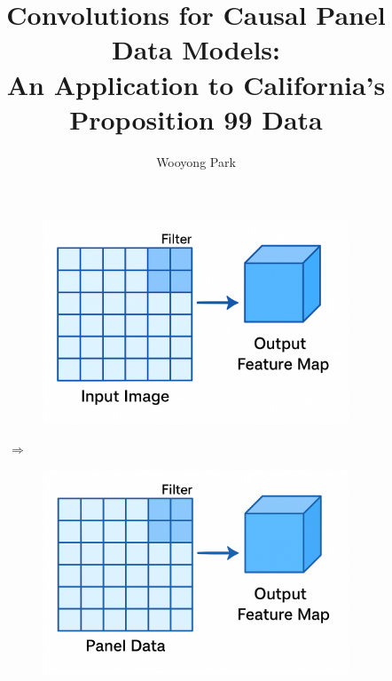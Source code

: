 \documentclass[12pt]{article}
\title{Convolutions for Causal Panel Data Models:\\
	An Application to California's Proposition 99 Data
}
\author{
	Wooyong Park\\
	\multicolumn{1}{p{.7\textwidth}}{\centering Yonsei University} 
}
\date{}
\begin{document}
	\begin{singlespace}
		\maketitle
	\end{singlespace}
	
	\begin{figure}[htbp]
		\centering
		\begin{subfigure}[c]{0.3\textwidth}
			\includegraphics[width=\textwidth]{../figures/intro1.png}
		\end{subfigure}
		\hspace{10pt}
		{\Large $\Longrightarrow$}
		\hspace{10pt}
		\begin{subfigure}[c]{0.3\textwidth}
			\includegraphics[width=\textwidth]{../figures/intro2.png}
		\end{subfigure}
	\end{figure}
\end{document}
